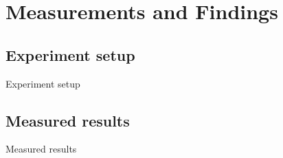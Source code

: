 \section{Measurements and Findings}
\subsection{Experiment setup}
Experiment setup

\subsection{Measured results}
Measured results